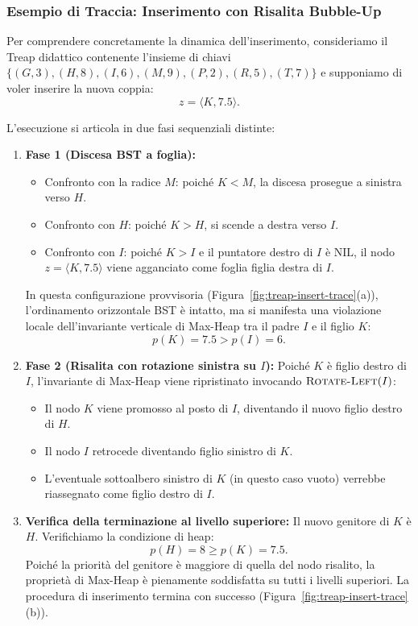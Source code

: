\subsubsection{Esempio di Traccia: Inserimento con Risalita Bubble-Up}
Per comprendere concretamente la dinamica dell'inserimento, consideriamo il Treap didattico contenente l'insieme di chiavi $\{ (G, 3), (H, 8), (I, 6), (M, 9), (P, 2), (R, 5), (T, 7) \}$ e supponiamo di voler inserire la nuova coppia:
\begin{equation}
  z = \langle K, 7.5 \rangle.
\end{equation}

L'esecuzione si articola in due fasi sequenziali distinte:
\begin{enumerate}
    \item \textbf{Fase 1 (Discesa BST a foglia):}
    \begin{itemize}
        \item Confronto con la radice $M$: poich\'e $K < M$, la discesa prosegue a sinistra verso $H$.
        \item Confronto con $H$: poich\'e $K > H$, si scende a destra verso $I$.
        \item Confronto con $I$: poich\'e $K > I$ e il puntatore destro di $I$ \`e $\mathrm{NIL}$, il nodo $z = \langle K, 7.5 \rangle$ viene agganciato come foglia figlia destra di $I$.
    \end{itemize}
    In questa configurazione provvisoria (Figura~\ref{fig:treap-insert-trace}(a)), l'ordinamento orizzontale BST \`e intatto, ma si manifesta una violazione locale dell'invariante verticale di Max-Heap tra il padre $I$ e il figlio $K$:
    \begin{equation}
      p(K) = 7.5 > p(I) = 6.
    \end{equation}
    
    \item \textbf{Fase 2 (Risalita con rotazione sinistra su $I$):}
    Poich\'e $K$ \`e figlio destro di $I$, l'invariante di Max-Heap viene ripristinato invocando $\textsc{Rotate-Left}(I)$:
    \begin{itemize}
        \item Il nodo $K$ viene promosso al posto di $I$, diventando il nuovo figlio destro di $H$.
        \item Il nodo $I$ retrocede diventando figlio sinistro di $K$.
        \item L'eventuale sottoalbero sinistro di $K$ (in questo caso vuoto) verrebbe riassegnato come figlio destro di $I$.
    \end{itemize}
    \item \textbf{Verifica della terminazione al livello superiore:}
    Il nuovo genitore di $K$ \`e $H$. Verifichiamo la condizione di heap:
    \begin{equation}
      p(H) = 8 \ge p(K) = 7.5.
    \end{equation}
    Poich\'e la priorit\`a del genitore \`e maggiore di quella del nodo risalito, la propriet\`a di Max-Heap \`e pienamente soddisfatta su tutti i livelli superiori. La procedura di inserimento termina con successo (Figura~\ref{fig:treap-insert-trace}(b)).
\end{enumerate}

